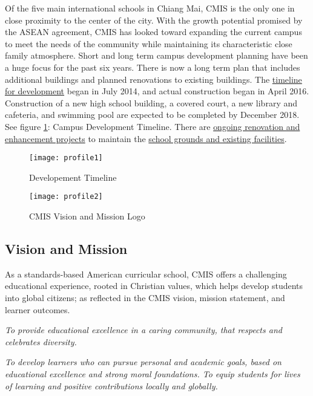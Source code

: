 Of the five main international schools in Chiang Mai, CMIS is the only one in close proximity to the center of the city.  With the growth potential promised by the ASEAN agreement, CMIS has looked toward expanding the current campus to meet the needs of the community while maintaining its characteristic close family atmosphere.  Short and long term campus development planning have been a huge focus for the past six years. There is now a long term plan that includes additional buildings and planned renovations to existing buildings.  The \href{https://docs.google.com/spreadsheets/d/12H8OtZlda_OBTVfUOYvEg0qghC6U9Xz93vGASmJF1hQ/edit#gid=0}{timeline for development} began in July 2014, and actual construction began in April 2016.  Construction of a new high school building, a covered court, a new library and cafeteria, and swimming pool are expected to be completed by December 2018. See figure \ref{figure:devtimeline}: Campus Development Timeline.  There are \href{https://docs.google.com/presentation/d/1o_AcPdYb1572Wbm7vk79ssg7RzkQykBGOqrKGVhTArw/edit#slide=id.ga51c5f54b_0_41}{ongoing renovation and enhancement projects} to maintain the \href{https://docs.google.com/presentation/d/1BSJvdHXlQ7o2US1hnvFOyPIcvA3WEPCRc9XYJAqlNt4/edit#slide=id.g540d23d42_034}{school grounds and existing facilities}.

\begin{figure}[H]
\centering
\texttt{[image: profile1]}
\caption{Developement Timeline}
\label{figure:devtimeline}
\end{figure}

\begin{figure}[H]
\centering
\texttt{[image: profile2]}
\caption{CMIS Vision and Mission Logo}
\label{figure:visionlogo}
\end{figure}

\subsection{Vision and Mission}

As a standards-based American curricular school, CMIS offers a challenging educational experience, rooted in Christian values, which helps develop students into global citizens; as reflected in the CMIS vision, mission statement, and learner outcomes.

\textit{To provide educational excellence in a caring community, that respects and celebrates diversity.}

\textit{To develop learners who can pursue personal and academic goals, based on educational excellence and strong moral foundations. To equip students for lives of learning and positive contributions locally and globally.}

